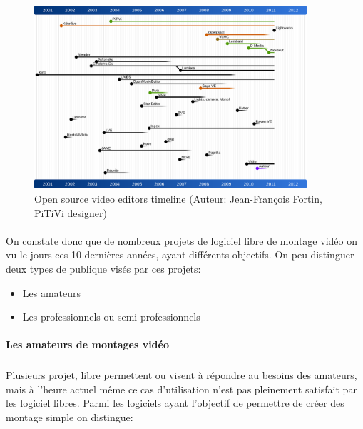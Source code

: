 \begin{figure} [h]
  \begin{center}
    \includegraphics[width=0.9\textwidth]{images/open-source-video-editor-timeline}
  \end{center} \caption{Open source video editors timeline (Auteur:
  Jean-François Fortin, PiTiVi designer)} \label{Yes}
\end{figure}

\paragraph{ }

On constate donc que de nombreux projets de logiciel libre de montage
vidéo on vu le jours ces 10 dernières années, ayant différents
objectifs.  On peu distinguer deux types de publique visés par ces
projets:

\begin {itemize}
  \item {Les amateurs}
  \item {Les professionnels ou semi professionnels}
\end {itemize}

\paragraph {Les amateurs de montages vidéo}

\subparagraph{}

Plusieurs projet, libre permettent ou visent à répondre au besoins
des amateurs, mais à l'heure actuel même ce cas d'utilisation n'est
pas pleinement satisfait par les logiciel libres. Parmi les logiciels
ayant l'objectif de permettre de créer des montage simple on distingue:

